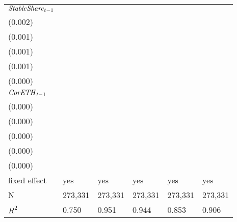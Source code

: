 \begin{tabular}{llllll}
${{\it StableShare}}_{t-1}$  &   \makecell{$0.111^{***}$ \\ (0.002)} &  \makecell{$-0.005^{***}$ \\ (0.001)} &  \makecell{$-0.006^{***}$ \\ (0.001)} &  \makecell{$0.027^{***}$ \\ (0.001)} &  \makecell{$0.011^{***}$ \\ (0.000)} \\
${{\it CorETH}}_{t-1}$       &  \makecell{$-0.000^{***}$ \\ (0.000)} &      \makecell{$0.000^{}$ \\ (0.000)} &     \makecell{$-0.000^{}$ \\ (0.000)} &     \makecell{$0.000^{}$ \\ (0.000)} &  \makecell{$-0.000^{**}$ \\ (0.000)} \\
\midrule fixed effect        &                                   yes &                                   yes &                                   yes &                                  yes &                                  yes \\
N                            &                               273,331 &                               273,331 &                               273,331 &                              273,331 &                              273,331 \\
$R^2$                        &                                 0.750 &                                 0.951 &                                 0.944 &                                0.853 &                                0.906 \\
\bottomrule
\end{tabular}
